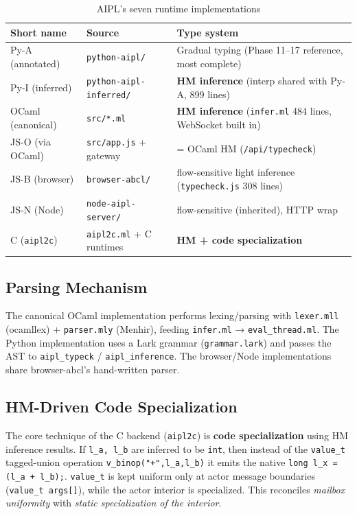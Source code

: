 \documentclass[11pt,a4paper]{article}
\newcommand{\code}[1]{\texttt{\small #1}}
\begin{document}
\begin{table}[h]
\centering\small
\caption{AIPL's seven runtime implementations}\label{tab:runtimes}
\begin{tabularx}{\linewidth}{@{}l l X@{}}
\toprule
Short name & Source & Type system \\
\midrule
Py-A (annotated) & \code{python-aipl/} & Gradual typing (Phase 11--17 reference, most complete) \\
Py-I (inferred) & \code{python-aipl-inferred/} & \textbf{HM inference} (interp shared with Py-A, 899 lines) \\
OCaml (canonical) & \code{src/*.ml} & \textbf{HM inference} (\code{infer.ml} 484 lines, WebSocket built in) \\
JS-O (via OCaml) & \code{src/app.js} + gateway & = OCaml HM (\code{/api/typecheck}) \\
JS-B (browser) & \code{browser-abcl/} & flow-sensitive light inference (\code{typecheck.js} 308 lines) \\
JS-N (Node) & \code{node-aipl-server/} & flow-sensitive (inherited), HTTP wrap \\
C (\code{aipl2c}) & \code{aipl2c.ml} + C runtimes & \textbf{HM + code specialization} \\
\bottomrule
\end{tabularx}
\end{table}

\subsection{Parsing Mechanism}
The canonical OCaml implementation performs lexing/parsing with
\code{lexer.mll} (ocamllex) + \code{parser.mly} (Menhir), feeding
\code{infer.ml} → \code{eval\_thread.ml}. The Python implementation uses
a Lark grammar (\code{grammar.lark}) and passes the AST to
\code{aipl\_typeck} / \code{aipl\_inference}. The browser/Node
implementations share browser-abcl's hand-written parser.

\subsection{HM-Driven Code Specialization}\label{sec:codegen}
The core technique of the C backend (\code{aipl2c}) is \textbf{code
specialization} using HM inference results. If \code{l\_a, l\_b} are
inferred to be \code{int}, then instead of the \code{value\_t}
tagged-union operation \code{v\_binop("+",l\_a,l\_b)} it emits the native
\code{long l\_x = (l\_a + l\_b);}. \code{value\_t} is kept uniform only at
actor message boundaries (\code{value\_t args[]}), while the actor
interior is specialized. This reconciles \emph{mailbox uniformity} with
\emph{static specialization of the interior}.
\end{document}
